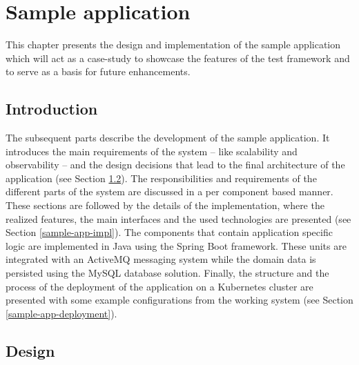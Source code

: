 \chapter{Sample application} \label{sample-app}

This chapter presents the design and implementation of the sample application which will act as a case-study to showcase the features of the test framework and to serve as a basis for future enhancements.

\section{Introduction} \label{sample-app-intro}

The subsequent parts describe the development of the sample application. It introduces the main requirements of the system -- like scalability and observability --  and the design decisions that lead to the final architecture of the application (see Section \ref{design}). The responsibilities and requirements of the different parts of the system are discussed in a per component based manner. These sections are followed by the details of the implementation, where the realized features, the main interfaces and the used technologies are presented (see Section \ref{sample-app-impl}). The components that contain application specific logic are implemented in Java using the Spring Boot framework. These units are integrated with an ActiveMQ messaging system while the domain data is persisted using the MySQL database solution.  Finally, the structure and the process of the deployment of the application on a Kubernetes cluster are presented with some example configurations from the working system (see Section \ref{sample-app-deployment}).


\section{Design} \label{design}

